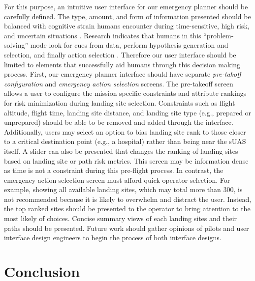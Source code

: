 For this purpose, an intuitive user interface for our emergency planner should be carefully defined. The type, amount, and form of information presented should be balanced with cognitive strain humans encounter during time-sensitive, high risk, and uncertain situations \cite{2003_technical_review_human_error}. Research indicates that humans in this ``problem-solving'' mode look for cues from data, perform hypothesis generation and selection, and finally action selection \cite{wickens_5_1988}. Therefore our user interface should be limited to elements that successfully aid humans through this decision making process. First, our emergency planner interface should have separate \emph{pre-takoff configuration} and \emph{emergency action selection} screens. The pre-takeoff screen allows a user to configure the mission specific constraints and attribute rankings for risk minimization during landing site selection. Constraints such as flight altitude, flight time, landing site distance, and landing site type (e.g., prepared or unprepared) should be able to be removed and added through the interface. Additionally, users may select an option to bias landing site rank to those closer to a critical destination point (e.g., a hospital) rather than being near the \ac{sUAS} itself. A slider can also be presented that changes the ranking of landing sites based on landing site or path risk metrics. This screen may be information dense as time is not a constraint during this pre-flight process. In contrast, the emergency action selection screen must afford quick operator selection. For example, showing all available landing sites, which may total more than 300, is not recommended because it is likely to overwhelm and distract the user. Instead, the top ranked sites should be presented to the operator to bring attention to the most likely of choices. Concise summary views of each landing sites and their paths should be presented. Future work should gather opinions of pilots and user interface design engineers to begin the process of both interface designs.

\section{Conclusion}\label{sec:ch5_conclusion}

